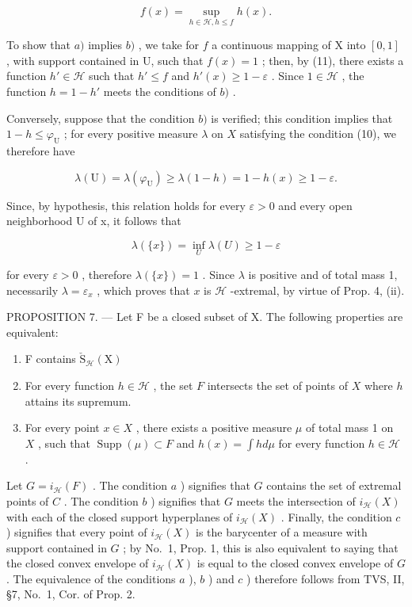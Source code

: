 \[
f (x) = \sup _ {h \in \mathscr {H}, h \leqslant f} h (x).\tag{11}
\]

To show that \(a)\) implies \(b)\) , we take for \(f\) a continuous mapping of X into \([0,1]\) , with support contained in U, such that \(f(x)=1\) ; then, by (11), there exists a function \(h'\in\mathscr{H}\) such that \(h'\leqslant f\) and \(h'(x)\geqslant 1-\varepsilon\) . Since \(1\in\mathscr{H}\) , the function \(h=1-h'\) meets the conditions of \(b)\) .

Conversely, suppose that the condition \(b)\) is verified; this condition implies that \(1 - h \leqslant \varphi_{\mathrm{U}}\) ; for every positive measure \(\lambda\) on \(X\) satisfying the condition (10), we therefore have

\[
\lambda (\mathrm{U}) = \lambda (\varphi_ {\mathrm{U}}) \geqslant \lambda (1 - h) = 1 - h (x) \geqslant 1 - \varepsilon .
\]

Since, by hypothesis, this relation holds for every \(\varepsilon > 0\) and every open neighborhood U of x, it follows that

\[
\lambda (\{x \}) = \inf _ {U} \lambda (U) \geqslant 1 - \varepsilon
\]

for every \(\varepsilon > 0\) , therefore \(\lambda(\{x\}) = 1\) . Since \(\lambda\) is positive and of total mass 1, necessarily \(\lambda = \varepsilon_x\) , which proves that \(x\) is \(\mathcal{H}\) -extremal, by virtue of Prop. 4, (ii).

PROPOSITION 7. --- Let F be a closed subset of X. The following properties are equivalent:

\begin{enumerate}
\def\labelenumi{\alph{enumi})}
\item
  F contains \(\check{\mathrm{S}}_{\mathcal{H}}(\mathrm{X})\)
\item
  For every function \(h \in \mathcal{H}\) , the set \(F\) intersects the set of points of \(X\) where \(h\) attains its supremum.
\item
  For every point \(x \in X\) , there exists a positive measure \(\mu\) of total mass 1 on \(X\) , such that \(\operatorname{Supp}(\mu) \subset F\) and \(h(x) = \int h d\mu\) for every function \(h \in \mathcal{H}\) .
\end{enumerate}

Let \(G = i_{\mathcal{H}}(F)\) . The condition \(a\) ) signifies that \(G\) contains the set of extremal points of \(C\) . The condition \(b\) ) signifies that \(G\) meets the intersection of \(i_{\mathcal{H}}(X)\) with each of the closed support hyperplanes of \(i_{\mathcal{H}}(X)\) . Finally, the condition \(c\) ) signifies that every point of \(i_{\mathcal{H}}(X)\) is the barycenter of a measure with support contained in \(G\) ; by No.~1, Prop. 1, this is also equivalent to saying that the closed convex envelope of \(i_{\mathcal{H}}(X)\) is equal to the closed convex envelope of \(G\) . The equivalence of the conditions \(a\) ), \(b\) ) and \(c\) ) therefore follows from TVS, II, §7, No.~1, Cor. of Prop. 2.

